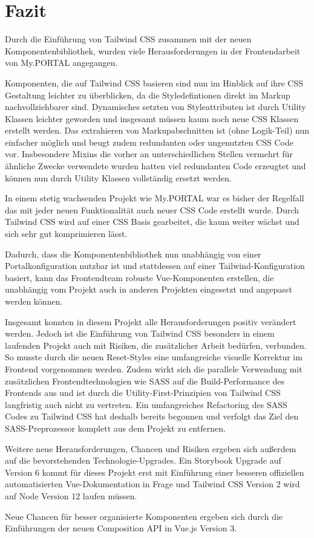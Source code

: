 \chapter{Fazit}
\label{cha:Fazit}
Durch die Einführung von Tailwind CSS zusammen mit der neuen Komponentenbibliothek, wurden viele Herausforderungen in der Frontendarbeit von My.PORTAL angegangen.

Komponenten, die auf Tailwind CSS basieren sind nun im Hinblick auf ihre CSS Gestaltung leichter zu überblicken, da die Styledefintionen direkt im Markup nachvollziehbarer sind. Dynamisches setzten von Styleattributen ist durch Utility Klassen leichter geworden und insgesamt müssen kaum noch neue CSS Klassen erstellt werden. Das extrahieren von Markupabschnitten ist (ohne Logik-Teil) nun einfacher möglich und beugt zudem redundanten oder ungenutzten CSS Code vor. Insbesondere Mixins die vorher an unterschiedlichen Stellen vermehrt für ähnliche Zwecke verwendete wurden hatten viel redundanten Code erzeugtet und können nun durch Utility Klassen vollständig ersetzt werden.

In einem stetig wachsenden Projekt wie My.PORTAL war es bisher der Regelfall das mit jeder neuen Funktionalität auch neuer CSS Code erstellt wurde. Durch Tailwind CSS wird auf einer CSS Basis gearbeitet, die kaum weiter wächst und sich sehr gut komprimieren lässt.

Dadurch, dass die Komponentenbibliothek nun unabhängig von einer Portalkonfiguration nutzbar ist und stattdessen auf einer Tailwind-Konfiguration basiert, kann das Frontendteam robuste Vue-Komponenten erstellen, die unabhängig vom Projekt auch in anderen Projekten eingesetzt und angepasst werden können.

Insgesamt konnten in diesem Projekt alle Herausforderungen positiv verändert werden. Jedoch ist die Einführung von Tailwind CSS besonders in einem laufenden Projekt auch mit Risiken, die zusätzlicher Arbeit bedürfen, verbunden. So musste durch die neuen Reset-Styles eine umfangreiche visuelle Korrektur im Frontend vorgenommen werden. Zudem wirkt sich die parallele Verwendung mit zusätzlichen Frontendtechnologien wie SASS auf die Build-Performance des Frontends aus und ist durch die Utility-First-Prinzipien von Tailwind CSS langfristig auch nicht zu vertreten. Ein umfangreiches Refactoring des SASS Codes zu Tailwind CSS hat deshalb bereits begonnen und verfolgt das Ziel den SASS-Preprozessor komplett aus dem Projekt zu entfernen.

Weitere neue Herausforderungen, Chancen und Risiken ergeben sich außerdem auf die bevorstehenden Technologie-Upgrades. Ein Storybook Upgrade auf Version 6 kommt für dieses Projekt erst mit Einführung einer besseren offiziellen automatisierten Vue-Dokumentation in Frage und Tailwind CSS Version 2 wird auf Node Version 12 laufen müssen.

Neue Chancen für besser organisierte Komponenten ergeben sich durch die Einführungen der neuen Composition API in Vue.js Version 3.
